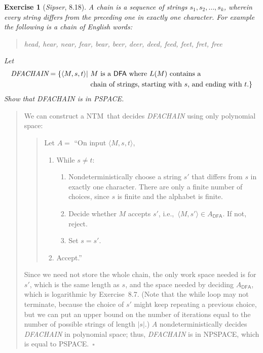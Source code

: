 \documentclass{article}
\theoremstyle{break}			%
\newtheorem{exercise}{Exercise}
\theoremstyle{plain}
\newenvironment{answer}{\begin{quotation}\noindent}{\end{quotation}}
\newcommand{\sipser}{\textit{Sipser}}
\newcommand{\encoding}[1]{\ensuremath{\langle#1\rangle}}
\renewcommand{\qed}{~\ensuremath{\square}}
\newcommand{\setname}[1]{\textit{#1}}
\newcommand{\NTM}{\textsf{NTM}}
\newcommand{\DFA}{\textsf{DFA}}
\begin{document}
\begin{exercise}[\sipser, 8.18]
A \textit{chain} is a sequence of strings $s_1,s_2,\ldots,s_k$,
wherein every string differs from the preceding one in exactly one
character.  For example the following is a chain of English words:
\begin{quote}
head, hear, near, fear, bear, beer, deer, deed, feed, feet, fret, free
\end{quote}
Let
\begin{align*}
\setname{DFACHAIN} = \{\encoding{M,s,t}|~
&M \text{ is a \DFA\ where $L(M)$ contains a} \\
&\text{chain of strings, starting with $s$, and ending with $t$.}\}
\end{align*}
Show that \setname{DFACHAIN} is in PSPACE.
\end{exercise}
\begin{answer}
We can construct a \NTM\ that decides \setname{DFACHAIN} using only
polynomial space:
\begin{quotation}
\noindent Let $A=$ ``On input $\encoding{M,s,t}$,
\begin{enumerate}
\item While $s \not= t$:
	\begin{enumerate}
	\item Nondeterministically choose a string $s'$ that differs
	from $s$ in exactly one character.  There are only a finite
	number of choices, since $s$ is finite and the alphabet is
	finite.
	\item Decide whether $M$ accepts $s'$,
	i.e.,~$\encoding{M,s'}\in A_{\DFA}$.  If not, reject. 
	\item Set $s=s'$.
	\end{enumerate}
\item Accept.''
\end{enumerate}
\end{quotation}
Since we need not store the whole chain, the only work space needed is
for $s'$, which is the same length as $s$, and the space needed by
deciding $A_{\DFA}$, which is logarithmic by Exercise~8.7.  (Note that
the while loop may not terminate, because the choice of $s'$ might
keep repeating a previous choice, but we can put an upper bound on the
number of iterations equal to the number of possible strings of length
$|s|$.)  $A$ nondeterministically decides \setname{DFACHAIN} in
polynomial space; thus, \setname{DFACHAIN} is in NPSPACE, which is
equal to PSPACE.\qed
\end{answer}
\end{document}

